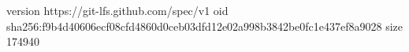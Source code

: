 version https://git-lfs.github.com/spec/v1
oid sha256:f9b4d40606ecf08cfd4860d0ceb03dfd12e02a998b3842be0fc1e437ef8a9028
size 174940

